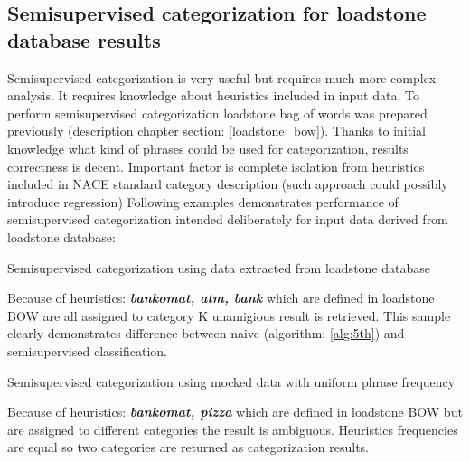 \subsection{Semisupervised categorization for loadstone database results}
Semisupervised categorization is very useful but requires much more complex analysis. It requires knowledge about heuristics included in input data. To perform semisupervised categorization loadstone bag of words was prepared previously (description chapter section: \ref{loadstone_bow}). Thanks to initial knowledge what kind of phrases could be used for categorization, results correctness is decent. Important factor is complete isolation from heuristics included in NACE standard category description (such approach could possibly introduce regression) Following examples demonstrates performance of semisupervised categorization intended deliberately for input data derived from loadstone database:
\newline
\begin{algorithm}[h]
	
	\hfill \break
	\caption{Semisupervised categorization using data extracted from loadstone database}
	\label{alg:6th}
\end{algorithm}
\newline
Because of heuristics: \textbf{\textit{bankomat, atm, bank}} which are defined in loadstone BOW are all assigned to category K unamigious result is retrieved. This sample clearly demonstrates difference between naive (algorithm: \ref{alg:5th}) and semisupervised classification.
\newline
\begin{algorithm}[h]
	
	\hfill \break
	\caption{Semisupervised categorization using mocked data with uniform phrase frequency}
	\label{alg:7th}
\end{algorithm}
\newline
Because of heuristics: \textbf{\textit{bankomat, pizza}} which are defined in loadstone BOW but are assigned to different categories the result is ambiguous. Heuristics frequencies are equal so two categories are returned as categorization results.
